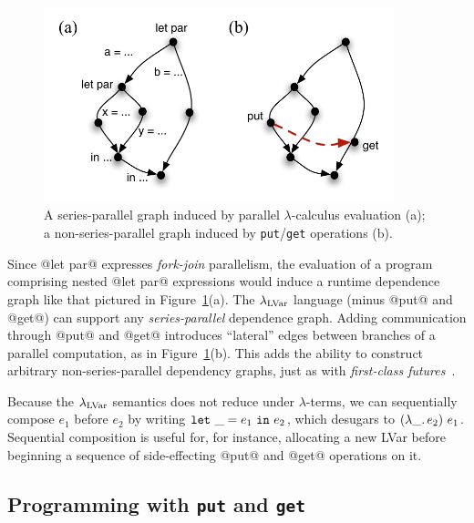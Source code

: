 \begin{figure}[tb]
  \centering 
\includegraphics[width=4in]{chapter2/figures/SeriesParallel.pdf} 
\caption{A series-parallel graph induced by parallel
  $\lambda$-calculus evaluation (a); a non-series-parallel graph
  induced by \lstinline|put|/\lstinline|get| operations (b).}
  \label{f:series-parallel}
\end{figure}

Since @let par@ expresses \emph{fork-join} parallelism, the evaluation
of a program comprising nested @let par@ expressions would induce a
runtime dependence graph like that pictured in
Figure~\ref{f:series-parallel}(a).  The $\lambda_{\textrm{LVar}}$ language (minus
@put@ and @get@) can support any \emph{series-parallel} dependence
graph.  Adding communication through @put@ and @get@ introduces
``lateral'' edges between branches of a parallel computation, as in
Figure~\ref{f:series-parallel}(b).  This adds the ability to construct
arbitrary non-series-parallel dependency graphs, just as with
\emph{first-class futures}~\cite{beyond-nested-workstealing}.

Because the $\lambda_{\textrm{LVar}}$ semantics does not reduce under
$\lambda$-terms, we can sequentially compose $e_1$ before $e_2$ by
writing $\mbox{\texttt{let}}~\_=e_1~\mbox{\texttt{in}}~e_2$, which desugars to
$(\lambda\_.\,e_2)~e_1$.  Sequential composition is useful for,
for instance, allocating a new LVar before beginning a sequence of
side-effecting @put@ and @get@ operations on it.

\subsection{Programming with \lstinline|put| and \lstinline|get|}\label{subsection:lvars-programming-with-put-and-get}

